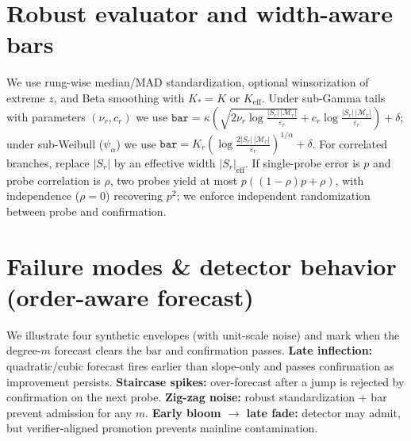 \documentclass{article}
\begin{document}
\section{Robust evaluator and width-aware bars}\label{app:robust-eval}
We use rung-wise median/MAD standardization, optional winsorization of extreme $z$, and Beta smoothing with $K_{*}{=}K$ or $K_{\mathrm{eff}}$.
Under sub-Gamma tails with parameters $(\nu_r,c_r)$ we use
$\texttt{bar}=\kappa(\sqrt{2\nu_r\log \frac{|S_r|\,|\mathcal{M}_r|}{\varepsilon_r}}+c_r\log \frac{|S_r|\,|\mathcal{M}_r|}{\varepsilon_r})+\delta$;
under sub-Weibull ($\psi_\alpha$) we use $\texttt{bar}=K_r(\log \frac{2|S_r|\,|\mathcal{M}_r|}{\varepsilon_r})^{1/\alpha}+\delta$.
For correlated branches, replace $|S_r|$ by an effective width $|S_r|_{\mathrm{eff}}$.
If single-probe error is $p$ and probe correlation is $\rho$, two probes yield at most $p((1-\rho)p+\rho)$,
with independence ($\rho\!=\!0$) recovering $p^2$; we enforce independent randomization between probe and confirmation.

\section{Failure modes \& detector behavior (order-aware forecast)}
We illustrate four synthetic envelopes (with unit-scale noise) and mark when the degree-$m$ forecast clears the bar and confirmation passes.
\textbf{Late inflection:} quadratic/cubic forecast fires earlier than slope-only and passes confirmation as improvement persists.
\textbf{Staircase spikes:} over-forecast after a jump is rejected by confirmation on the next probe.
\textbf{Zig-zag noise:} robust standardization + bar prevent admission for any $m$.
\textbf{Early bloom $\to$ late fade:} detector may admit, but verifier-aligned promotion prevents mainline contamination.
\end{document}
